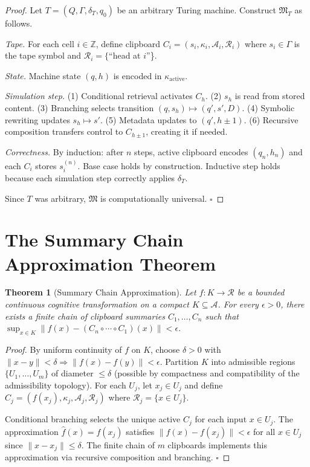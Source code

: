 \documentclass[12pt,oneside]{book}
\theoremstyle{plain}
\newtheorem{theorem}{Theorem}[chapter]
\theoremstyle{definition}
\theoremstyle{plain}
\newcommand{\cA}{\mathcal{A}}
\newcommand{\cR}{\mathcal{R}}
\newcommand{\fM}{\mathfrak{M}}
\begin{document}
\begin{proof}
Let $T = (Q, \Gamma, \delta_T, q_0)$ be an arbitrary Turing machine. Construct $\fM_T$ as follows.

\emph{Tape.} For each cell $i \in \mathbb{Z}$, define clipboard $C_i = (s_i, \kappa_i, \cA_i, \cR_i)$ where $s_i \in \Gamma$ is the tape symbol and $\cR_i = \{$``head at $i$''\}.

\emph{State.} Machine state $(q, h)$ is encoded in $\kappa_{\text{active}}$.

\emph{Simulation step.} (1) Conditional retrieval activates $C_h$. (2) $s_h$ is read from stored content. (3) Branching selects transition $(q, s_h) \mapsto (q', s', D)$. (4) Symbolic rewriting updates $s_h \mapsto s'$. (5) Metadata updates to $(q', h \pm 1)$. (6) Recursive composition transfers control to $C_{h\pm1}$, creating it if needed.

\emph{Correctness.} By induction: after $n$ steps, active clipboard encodes $(q_n, h_n)$ and each $C_i$ stores $s_i^{(n)}$. Base case holds by construction. Inductive step holds because each simulation step correctly applies $\delta_T$.

Since $T$ was arbitrary, $\fM$ is computationally universal. $\square$
\end{proof}

\section{The Summary Chain Approximation Theorem}

\begin{theorem}[Summary Chain Approximation]
Let $f : K \to \cR$ be a bounded continuous cognitive transformation on a compact $K \subseteq \cA$. For every $\epsilon > 0$, there exists a finite chain of clipboard summaries $C_1, \ldots, C_n$ such that $\sup_{x \in K}\|f(x) - (C_n \circ \cdots \circ C_1)(x)\| < \epsilon$.
\end{theorem}

\begin{proof}
By uniform continuity of $f$ on $K$, choose $\delta > 0$ with $\|x - y\| < \delta \Rightarrow \|f(x) - f(y)\| < \epsilon$. Partition $K$ into admissible regions $\{U_1, \ldots, U_m\}$ of diameter $\leq \delta$ (possible by compactness and compatibility of the admissibility topology). For each $U_j$, let $x_j \in U_j$ and define $C_j = (f(x_j), \kappa_j, \cA_j, \cR_j)$ where $\cR_j = \{x \in U_j\}$.

Conditional branching selects the unique active $C_j$ for each input $x \in U_j$. The approximation $\hat{f}(x) = f(x_j)$ satisfies $\|f(x) - f(x_j)\| < \epsilon$ for all $x \in U_j$ since $\|x - x_j\| \leq \delta$. The finite chain of $m$ clipboards implements this approximation via recursive composition and branching. $\square$
\end{proof}
\end{document}
